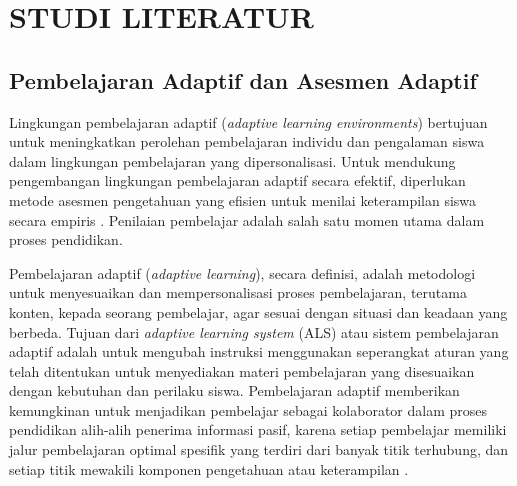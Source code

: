 \chapter{STUDI LITERATUR}
\label{chap:studi-literatur}


\section{Pembelajaran Adaptif dan Asesmen Adaptif}
\label{sec:adaptive_learning_assessment}
Lingkungan pembelajaran adaptif (\textit{adaptive learning environments}) bertujuan
untuk meningkatkan perolehan pembelajaran individu dan pengalaman siswa dalam
lingkungan pembelajaran yang dipersonalisasi. Untuk mendukung pengembangan lingkungan
pembelajaran adaptif secara efektif, diperlukan metode asesmen pengetahuan yang
efisien untuk menilai keterampilan siswa secara empiris \autocite{Minn2022}. Penilaian
pembelajar adalah salah satu momen utama dalam proses pendidikan.

Pembelajaran adaptif (\textit{adaptive learning}), secara definisi, adalah metodologi
untuk menyesuaikan dan mempersonalisasi proses pembelajaran, terutama konten, kepada
seorang pembelajar, agar sesuai dengan situasi dan keadaan yang berbeda. Tujuan dari
\textit{adaptive learning system} (ALS) atau sistem pembelajaran adaptif
adalah untuk mengubah instruksi menggunakan seperangkat aturan yang telah
ditentukan untuk menyediakan materi pembelajaran yang disesuaikan dengan
kebutuhan dan perilaku siswa. Pembelajaran adaptif memberikan kemungkinan
untuk menjadikan pembelajar sebagai kolaborator dalam proses pendidikan
alih-alih penerima informasi pasif, karena setiap pembelajar memiliki jalur
pembelajaran optimal spesifik yang terdiri dari banyak titik terhubung, dan setiap
titik mewakili komponen pengetahuan atau keterampilan \autocite{Ihichr2024}.

